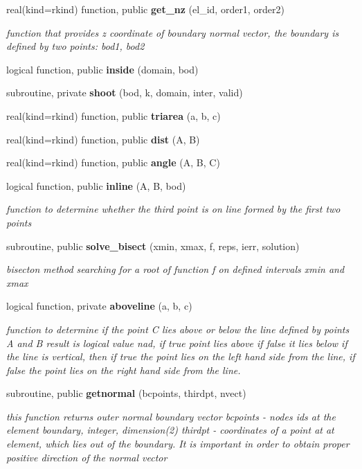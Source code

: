 \begin{DoxyCompactItemize}
real(kind=rkind) function, public {\bf get\+\_\+nz} (el\+\_\+id, order1, order2)
\begin{DoxyCompactList}\small\item\em function that provides z coordinate of boundary normal vector, the boundary is defined by two points\+: bod1, bod2 \end{DoxyCompactList}\item 
logical function, public {\bf inside} (domain, bod)
\item 
subroutine, private {\bf shoot} (bod, k, domain, inter, valid)
\item 
real(kind=rkind) function, public {\bf triarea} (a, b, c)
\item 
real(kind=rkind) function, public {\bf dist} (A, B)
\item 
real(kind=rkind) function, public {\bf angle} (A, B, C)
\item 
logical function, public {\bf inline} (A, B, bod)
\begin{DoxyCompactList}\small\item\em function to determine whether the third point is on line formed by the first two points \end{DoxyCompactList}\item 
subroutine, public {\bf solve\+\_\+bisect} (xmin, xmax, f, reps, ierr, solution)
\begin{DoxyCompactList}\small\item\em bisecton method searching for a root of function f on defined intervals xmin and xmax \end{DoxyCompactList}\item 
logical function, private {\bf aboveline} (a, b, c)
\begin{DoxyCompactList}\small\item\em function to determine if the point C lies above or below the line defined by points A and B result is logical value nad, if true point lies above if false it lies below if the line is vertical, then if true the point lies on the left hand side from the line, if false the point lies on the right hand side from the line. \end{DoxyCompactList}\item 
subroutine, public {\bf getnormal} (bcpoints, thirdpt, nvect)
\begin{DoxyCompactList}\small\item\em this function returns outer normal boundary vector bcpoints -\/ nodes ids at the element boundary, integer, dimension(2) thirdpt -\/ coordinates of a point at at element, which lies out of the boundary. It is important in order to obtain proper positive direction of the normal vector \end{DoxyCompactList}\item 

\end{DoxyCompactItemize}
